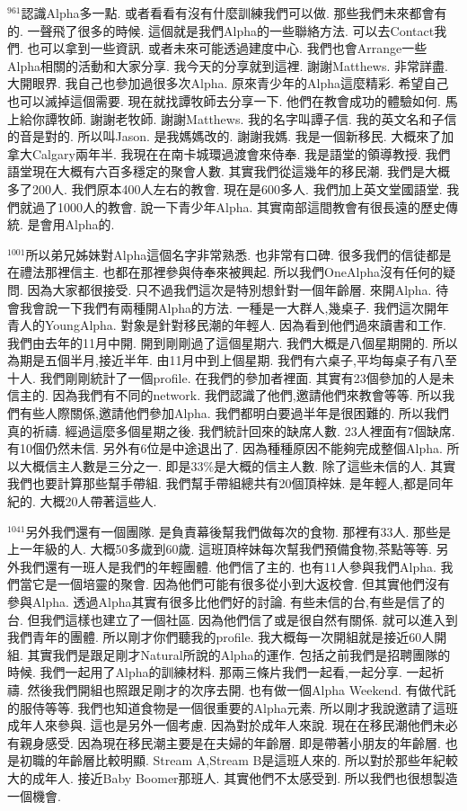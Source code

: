 \documentclass{book}
\begin{document}
$^{961}$認識Alpha多一點.
或者看看有沒有什麼訓練我們可以做.
那些我們未來都會有的.
一聲飛了很多的時候.
這個就是我們Alpha的一些聯絡方法.
可以去Contact我們.
也可以拿到一些資訊.
或者未來可能透過建度中心.
我們也會Arrange一些Alpha相關的活動和大家分享.
我今天的分享就到這裡.
謝謝Matthews.
非常詳盡.
大開眼界.
我自己也參加過很多次Alpha.
原來青少年的Alpha這麼精彩.
希望自己也可以滅掉這個需要.
現在就找譚牧師去分享一下.
他們在教會成功的體驗如何.
馬上給你譚牧師.
謝謝老牧師.
謝謝Matthews.
我的名字叫譚子信.
我的英文名和子信的音是對的.
所以叫Jason.
是我媽媽改的.
謝謝我媽.
我是一個新移民.
大概來了加拿大Calgary兩年半.
我現在在南卡城環過渡會來侍奉.
我是語堂的領導教授.
我們語堂現在大概有六百多穩定的聚會人數.
其實我們從這幾年的移民潮.
我們是大概多了200人.
我們原本400人左右的教會.
現在是600多人.
我們加上英文堂國語堂.
我們就過了1000人的教會.
說一下青少年Alpha.
其實南部這間教會有很長遠的歷史傳統.
是會用Alpha的.

$^{1001}$所以弟兄姊妹對Alpha這個名字非常熟悉.
也非常有口碑.
很多我們的信徒都是在禮法那裡信主.
也都在那裡參與侍奉來被興起.
所以我們OneAlpha沒有任何的疑問.
因為大家都很接受.
只不過我們這次是特別想針對一個年齡層.
來開Alpha.
待會我會說一下我們有兩種開Alpha的方法.
一種是一大群人,幾桌子.
我們這次開年青人的YoungAlpha.
對象是針對移民潮的年輕人.
因為看到他們過來讀書和工作.
我們由去年的11月中開.
開到剛剛過了這個星期六.
我們大概是八個星期開的.
所以為期是五個半月,接近半年.
由11月中到上個星期.
我們有六桌子,平均每桌子有八至十人.
我們剛剛統計了一個profile.
在我們的參加者裡面.
其實有23個參加的人是未信主的.
因為我們有不同的network.
我們認識了他們,邀請他們來教會等等.
所以我們有些人際關係,邀請他們參加Alpha.
我們都明白要過半年是很困難的.
所以我們真的祈禱.
經過這麼多個星期之後.
我們統計回來的缺席人數.
23人裡面有7個缺席.
有10個仍然未信.
另外有6位是中途退出了.
因為種種原因不能夠完成整個Alpha.
所以大概信主人數是三分之一.
即是33\%是大概的信主人數.
除了這些未信的人.
其實我們也要計算那些幫手帶組.
我們幫手帶組總共有20個頂梓妹.
是年輕人,都是同年紀的.
大概20人帶著這些人.

$^{1041}$另外我們還有一個團隊.
是負責幕後幫我們做每次的食物.
那裡有33人.
那些是上一年級的人.
大概50多歲到60歲.
這班頂梓妹每次幫我們預備食物,茶點等等.
另外我們還有一班人是我們的年輕團體.
他們信了主的.
也有11人參與我們Alpha.
我們當它是一個培靈的聚會.
因為他們可能有很多從小到大返校會.
但其實他們沒有參與Alpha.
透過Alpha其實有很多比他們好的討論.
有些未信的台,有些是信了的台.
但我們這樣也建立了一個社區.
因為他們信了或是很自然有關係.
就可以進入到我們青年的團體.
所以剛才你們聽我的profile.
我大概每一次開組就是接近60人開組.
其實我們是跟足剛才Natural所說的Alpha的運作.
包括之前我們是招聘團隊的時候.
我們一起用了Alpha的訓練材料.
那兩三條片我們一起看,一起分享.
一起祈禱.
然後我們開組也照跟足剛才的次序去開.
也有做一個Alpha Weekend.
有做代託的服侍等等.
我們也知道食物是一個很重要的Alpha元素.
所以剛才我說邀請了這班成年人來參與.
這也是另外一個考慮.
因為對於成年人來說.
現在在移民潮他們未必有親身感受.
因為現在移民潮主要是在夫婦的年齡層.
即是帶著小朋友的年齡層.
也是初職的年齡層比較明顯.
Stream A,Stream B是這班人來的.
所以對於那些年紀較大的成年人.
接近Baby Boomer那班人.
其實他們不太感受到.
所以我們也很想製造一個機會.
\end{document}
